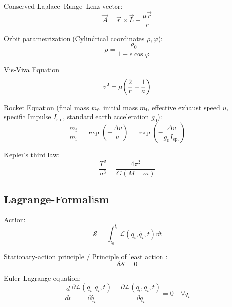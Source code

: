 		\noindent
		Conserved Laplace--Runge--Lenz vector:
		\begin{equation}
			\vec{A} = \dot{\vec{r}}\times\vec{L} - \frac{\mu \vec{r}}{r}
		\end{equation}

		\noindent
		Orbit parametrization (Cylindrical coordinates $\rho, \varphi$):
		\begin{equation}
			\rho = \frac{\rho_0}{1+\epsilon \cos\varphi}
		\end{equation}

		\noindent
		Vis-Viva Equation
		\begin{equation}
			v^2 = \mu\qty(\frac{2}{r} - \frac{1}{a})
		\end{equation}

		\noindent
		Rocket Equation (final mass $m_\text{f}$, initial mass $m_\text{i}$, effective exhaust speed $u$, specific Impulse $I_{\text{sp.}}$, standard earth acceleration $g_0$):
		\begin{equation}
			\frac{m_\text{f}}{m_\text{i}} = \exp(-\frac{\Delta v}{u}) = \exp(-\frac{\Delta v}{g_0 I_{\text{sp.}}})
		\end{equation}

		\noindent
		Kepler's third law:
		\begin{equation}
			\frac{T^2}{a^3} = \frac{4\pi^2}{G(M+m)}
		\end{equation}

	\subsection{Lagrange-Formalism}
		\noindent
		Action:
		\begin{equation}
			\mathcal{S}=\int_{t_0}^{t_1}\mathcal{L}(q_i, \dot{q_i},t)\dd{t}
		\end{equation}

		\noindent
		Stationary-action principle / Principle of least action :
		\begin{equation}
			\delta \mathcal{S}=0
		\end{equation}

		\noindent
		Euler--Lagrange equation:
		\begin{equation}
			\frac{d}{dt} \frac{\partial \mathcal{L}(q_{i},\dot{q_{i}},t)}{\partial \dot{q_{i}}} - \frac{\partial \mathcal{L}(q_{i},\dot{q_{i}},t)}{\partial q_{i}} = 0 \quad \forall q_i
		\end{equation}


